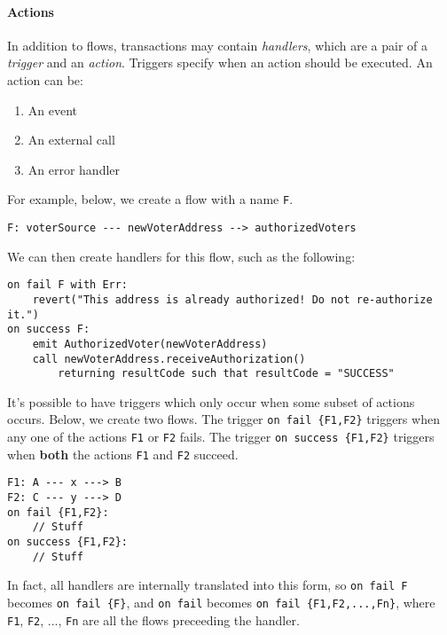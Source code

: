 \documentclass[10pt]{article}
\begin{document}
\paragraph{Actions}
In addition to flows, transactions may contain \emph{handlers}, which are a pair of a \emph{trigger} and an \emph{action}.
Triggers specify when an action should be executed.
An action can be:
\begin{enumerate}
    \item An event
    \item An external call
    \item An error handler
\end{enumerate}


For example, below, we create a flow with a name \lstinline{F}.
\begin{lstlisting}
F: voterSource --- newVoterAddress --> authorizedVoters
\end{lstlisting}

We can then create handlers for this flow, such as the following:
\begin{lstlisting}
on fail F with Err:
    revert("This address is already authorized! Do not re-authorize it.")
on success F:
    emit AuthorizedVoter(newVoterAddress)
    call newVoterAddress.receiveAuthorization()
        returning resultCode such that resultCode = "SUCCESS"
\end{lstlisting}

It's possible to have triggers which only occur when some subset of actions occurs.
Below, we create two flows.
The trigger \lstinline|on fail {F1,F2}| triggers when any one of the actions \lstinline{F1} or \lstinline{F2} fails.
The trigger \lstinline|on success {F1,F2}| triggers when \textbf{both} the actions \lstinline{F1} and \lstinline{F2} succeed.
\begin{lstlisting}
F1: A --- x ---> B
F2: C --- y ---> D
on fail {F1,F2}:
    // Stuff
on success {F1,F2}:
    // Stuff
\end{lstlisting}

In fact, all handlers are internally translated into this form, so \lstinline{on fail F} becomes \lstinline|on fail {F}|, and \lstinline{on fail} becomes \lstinline|on fail {F1,F2,...,Fn}|, where \lstinline{F1}, \lstinline{F2}, ..., \lstinline{Fn} are all the flows preceeding the handler.
\end{document}

